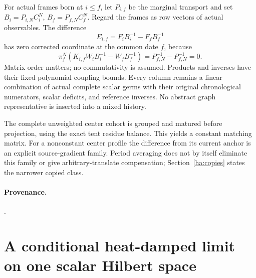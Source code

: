 For actual frames born at $i\leq f$, let $P_{i,f}$ be the marginal
transport and set
$B_i=P_{i,N}C_i^N$, $B_f=P_{f,N}C_f^N$.  Regard the frames as row
vectors of actual observables.  The difference
\begin{equation}
 E_{i,f}=F_iB_i^{-1}-F_fB_f^{-1}
 \label{ha:actual-difference}
\end{equation}
has zero corrected coordinate at the common date $f$, because
\begin{equation}
 \pi_f^N(K_{i,f}W_iB_i^{-1}-W_fB_f^{-1})
            =P_{f,N}^{-1}-P_{f,N}^{-1}=0.
 \label{ha:matching-zero}
\end{equation}
Matrix order matters; no commutativity is assumed.  Products and inverses
have their fixed polynomial coupling bounds.  Every column remains a
linear combination of actual complete scalar germs with their original
chronological numerators, scalar deficits, and reference inverses.
No abstract graph representative is inserted into a mixed history.

The complete unweighted center cohort is grouped and matured before
projection, using the exact tent residue balance.  This yields a constant
matching matrix.  For a nonconstant center profile the difference from
its current anchor is an explicit source-gradient family.  Period averaging
does not by itself eliminate this family or give arbitrary-translate
compensation; Section~\ref{ha:copies} states the narrower copied class.

\paragraph{Provenance.}
.

\section{A conditional heat-damped limit on one scalar Hilbert space}
\label{ha:heat-limit}

